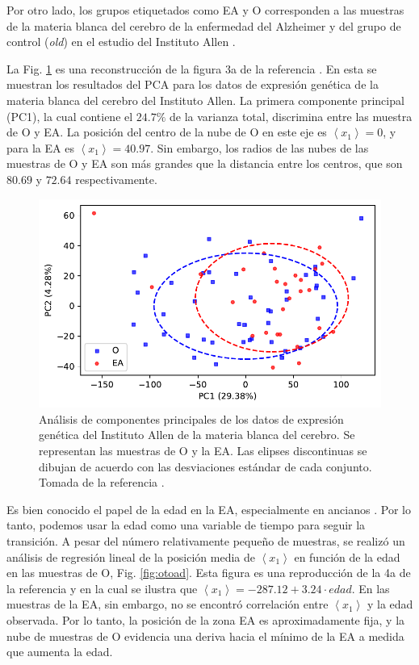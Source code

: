 Por otro lado, los grupos etiquetados como EA y O corresponden a las muestras de la materia blanca del cerebro de la enfermedad del Alzheimer y del grupo de control (\textit{old}) en el estudio del Instituto Allen \cite{Miller_2017}. 

La Fig. \ref{fig:pcaotoad} es una reconstrucción de la figura 3a de la referencia \cite{Gonzalez_2021}. En esta se muestran los resultados del PCA para los datos de expresión genética de la materia blanca del cerebro del Instituto Allen. La primera componente principal (PC1), la cual contiene el $24.7 \%$ de la varianza total, discrimina entre las muestra de O y EA. La posición del centro de la nube de O en este eje es $\left\langle x_1 \right\rangle  = 0 $, y para la EA es $\left\langle x_1 \right\rangle = 40.97 $. Sin embargo, los radios de las nubes de las muestras de O y EA son más grandes que la distancia entre los centros, que son $80.69$ y $72.64$ respectivamente.

\begin{figure}[!htb]
	\centering
	\includegraphics[width=0.75\linewidth]{figures/pca_o_to_ad_1}
	\caption{ Análisis de componentes principales de los datos de expresión genética del Instituto Allen de la materia blanca del cerebro. Se representan las muestras de O y la EA. Las elipses discontinuas se dibujan de acuerdo con las desviaciones estándar de cada conjunto. Tomada de la referencia \cite{Gonzalez_2021}.}
	\label{fig:pcaotoad}
\end{figure}

Es bien conocido el papel de la edad en la EA, especialmente en ancianos \cite{alz2019}. Por lo tanto, podemos usar la edad como una variable de tiempo para seguir la transición. A pesar del número relativamente pequeño de muestras, se realizó un análisis de regresión lineal de la posición media de $\left\langle x_1 \right\rangle$ en función de la edad en las muestras de O, Fig. \ref{fig:otoad}. Esta figura es una reproducción de la 4a de la referencia \cite{Gonzalez_2021} y en la cual se ilustra que $\left\langle x_1 \right\rangle = -287.12 + 3.24 \cdot edad$. En las muestras de la EA, sin embargo, no se encontró correlación entre $\left\langle x_1 \right\rangle$ y la edad observada. Por lo tanto, la posición de la zona EA es aproximadamente fija, y la nube de muestras de O evidencia una deriva hacia el mínimo de la EA a medida que aumenta la edad.

